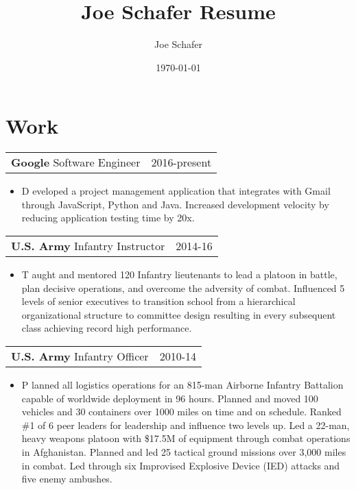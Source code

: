\documentclass[letterpaper]{jschaf-resume}
\title{Joe Schafer Resume}
\author{Joe Schafer}
\date{\today}
\makeatletter
\newcommand{\Mark}[1]{\textsuperscript{#1}}
\newcommand{\resitem}[1]{\item #1 \vspace{-2pt}}
\newcommand{\cventry}[3]{
\begin{tabularx}{3.5in}{X<{\cftdotfill{\cftsecdotsep}}@{}r}
  \textbf{#1} #2 & #3 \\
\end{tabularx}}
\makeatother
\begin{document}

\section{Work}

\cventry{Google}{Software Engineer}{2016-present}
\begin{itemize}
  \resitem Developed a project management application that integrates with Gmail
  through JavaScript, Python and Java.  Increased development velocity by
  reducing application testing time by 20x.
\end{itemize}

\cventry{U.S. Army}{Infantry Instructor}{2014-16}
\begin{itemize}
  \resitem Taught and mentored 120 Infantry lieutenants to lead a platoon in
  battle, plan decisive operations, and overcome the adversity of combat.
  Influenced 5 levels of senior executives to transition school from a
  hierarchical organizational structure to committee design resulting in every
  subsequent class achieving record high performance.
\end{itemize}

\cventry{U.S. Army}{Infantry Officer}{2010-14}

\begin{itemize}
  \resitem Planned all logistics operations for an 815-man Airborne Infantry
  Battalion capable of worldwide deployment in 96 hours.  Planned and moved 100
  vehicles and 30 containers over 1000 miles on time and on schedule.  Ranked
  \#1 of 6 peer leaders for leadership and influence two levels up.  Led a
  22-man, heavy weapons platoon with \$17.5M of equipment through combat
  operations in Afghanistan.  Planned and led 25 tactical ground missions over
  3,000 miles in combat.  Led through six Improvised Explosive Device (IED)
  attacks and five enemy ambushes.
\end{itemize}
\end{document}
